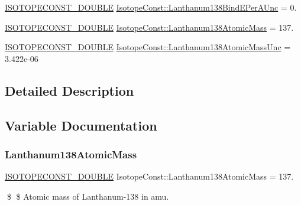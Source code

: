 \begin{DoxyCompactItemize}
\mbox{\hyperlink{group___isotope_const-_macros_ga8f45a7272ce02c0b4c65c44636ed719a}{I\+S\+O\+T\+O\+P\+E\+C\+O\+N\+S\+T\+\_\+\+D\+O\+U\+B\+LE}} \mbox{\hyperlink{group___isotope_const-_lanthanum-_la138_ga9a2b8eac94e512a227010c66140bd3e7}{Isotope\+Const\+::\+Lanthanum138\+Bind\+E\+Per\+A\+Unc}} = 0.
\item 
\mbox{\hyperlink{group___isotope_const-_macros_ga8f45a7272ce02c0b4c65c44636ed719a}{I\+S\+O\+T\+O\+P\+E\+C\+O\+N\+S\+T\+\_\+\+D\+O\+U\+B\+LE}} \mbox{\hyperlink{group___isotope_const-_lanthanum-_la138_gab66a0930ebd452f6bfde5a10f4ef8b16}{Isotope\+Const\+::\+Lanthanum138\+Atomic\+Mass}} = 137.
\item 
\mbox{\hyperlink{group___isotope_const-_macros_ga8f45a7272ce02c0b4c65c44636ed719a}{I\+S\+O\+T\+O\+P\+E\+C\+O\+N\+S\+T\+\_\+\+D\+O\+U\+B\+LE}} \mbox{\hyperlink{group___isotope_const-_lanthanum-_la138_gabe6872d80034f3881b389e5e097ae600}{Isotope\+Const\+::\+Lanthanum138\+Atomic\+Mass\+Unc}} = 3.\+422e-\/06
\end{DoxyCompactItemize}


\subsection{Detailed Description}


\subsection{Variable Documentation}
\mbox{\label{group___isotope_const-_lanthanum-_la138_gab66a0930ebd452f6bfde5a10f4ef8b16}} 
\subsubsection{\texorpdfstring{Lanthanum138\+Atomic\+Mass}{Lanthanum138AtomicMass}}
{\footnotesize\ttfamily \mbox{\hyperlink{group___isotope_const-_macros_ga8f45a7272ce02c0b4c65c44636ed719a}{I\+S\+O\+T\+O\+P\+E\+C\+O\+N\+S\+T\+\_\+\+D\+O\+U\+B\+LE}} Isotope\+Const\+::\+Lanthanum138\+Atomic\+Mass = 137.}

\$ \$ Atomic mass of Lanthanum-\/138 in amu. \mbox{\label{group___isotope_const-_lanthanum-_la138_gabe6872d80034f3881b389e5e097ae600}} 
